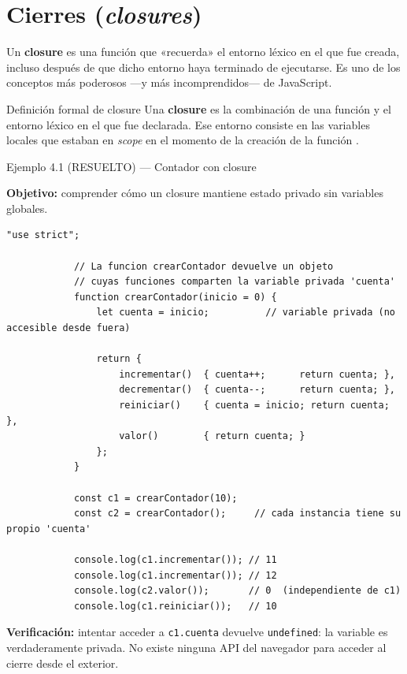 \documentclass[11pt,a4paper,openany]{book}
\begin{document}
	\section{Cierres (\emph{closures})}
	\label{sec:4.closures}
	
	Un \textbf{closure} es una función que «recuerda» el entorno
	léxico en el que fue creada, incluso después de que dicho entorno
	haya terminado de ejecutarse. Es uno de los conceptos más
	poderosos —y más incomprendidos— de JavaScript.
	
	\begin{cajadefinicion}{Definición formal de closure}
		Una \textbf{closure} es la combinación de una función y el
		entorno léxico en el que fue declarada. Ese entorno consiste en
		las variables locales que estaban en \emph{scope} en el momento
		de la creación de la función \cite{flanagan2020javascript}.
	\end{cajadefinicion}
	
	\begin{cajaejemplo}{Ejemplo 4.1 (RESUELTO) — Contador con closure}
		
		\textbf{Objetivo:} comprender cómo un closure mantiene estado
		privado sin variables globales.
		
		\begin{lstlisting}[style=js,caption={Contador encapsulado con closure},label=lst:4.7]
			"use strict";
			
			// La funcion crearContador devuelve un objeto
			// cuyas funciones comparten la variable privada 'cuenta'
			function crearContador(inicio = 0) {
				let cuenta = inicio;          // variable privada (no accesible desde fuera)
				
				return {
					incrementar()  { cuenta++;      return cuenta; },
					decrementar()  { cuenta--;      return cuenta; },
					reiniciar()    { cuenta = inicio; return cuenta; },
					valor()        { return cuenta; }
				};
			}
			
			const c1 = crearContador(10);
			const c2 = crearContador();     // cada instancia tiene su propio 'cuenta'
			
			console.log(c1.incrementar()); // 11
			console.log(c1.incrementar()); // 12
			console.log(c2.valor());       // 0  (independiente de c1)
			console.log(c1.reiniciar());   // 10
		\end{lstlisting}
		
		\textbf{Verificación:} intentar acceder a \texttt{c1.cuenta}
		devuelve \texttt{undefined}: la variable es verdaderamente
		privada. No existe ninguna API del navegador para acceder al
		cierre desde el exterior.
	\end{cajaejemplo}
	
\end{document}

